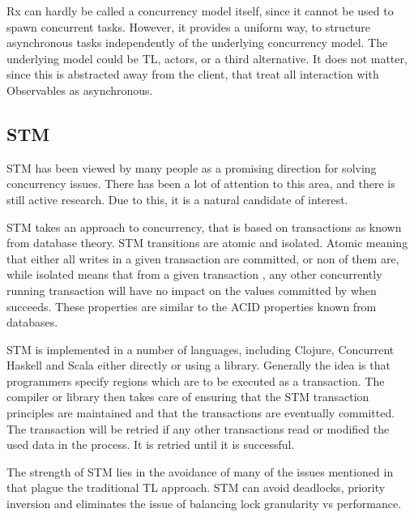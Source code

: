 \ac{Rx} can hardly be called a concurrency model itself, since it cannot be used to spawn concurrent tasks. However, it provides a uniform way, to structure asynchronous tasks independently of the underlying concurrency model. The underlying model could be \ac{TL}, actors, or a third alternative. It does not matter, since this is abstracted away from the client, that treat all interaction with Observables as asynchronous.

\subsection{\acl{STM}}
\ac{STM} has been viewed by many people as a promising direction for solving concurrency issues\cite{sutter2005software}. There has been a lot of attention to this area, and there is still active research. Due to this, it is a natural candidate of interest.

\ac{STM} takes an approach to concurrency, that is based on transactions as known from database theory\cite[p. 1]{shavit1997software}. \ac{STM} transitions are atomic and isolated. Atomic meaning that either all writes in a given transaction are committed, or non of them are, while isolated means that from a given transaction , any other concurrently running transaction will have no impact on the values committed by  when  succeeds\cite[p. 102]{sevenModels}. These properties are similar to the \ac{ACID} properties known from databases\cite[p. 754]{elmasri2011fundamentals}.

\ac{STM} is implemented in a number of languages, including Clojure\cite[p. 101]{sevenModels}, Concurrent Haskell\cite{harris2005composable} and Scala\cite{goodman2011muts} either directly or using a library. Generally the idea is that programmers specify regions which are to be executed as a transaction. The compiler or library then takes care of ensuring that the \ac{STM} transaction principles are maintained and that the transactions are eventually committed\cite[p. 1]{saha2006mcrt}. The transaction will be retried if any other transactions read or modified the used data in the process. It is retried until it is successful.

The strength of \ac{STM} lies in the avoidance of many of the issues mentioned in  that plague the traditional \ac{TL} approach. \ac{STM} can avoid deadlocks, priority inversion and eliminates the issue of balancing lock granularity vs performance\cite[p. 1]{harris2005composable}.


